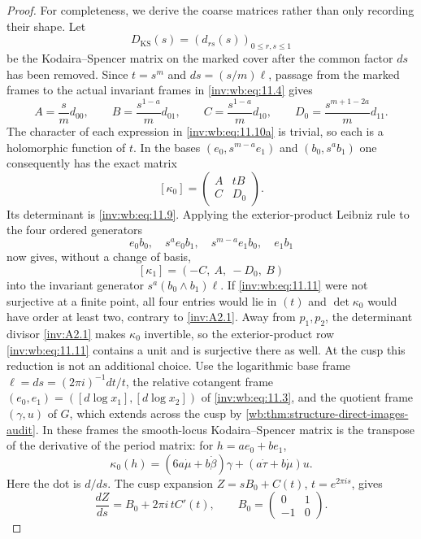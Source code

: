\begin{proof}
For completeness, we derive the coarse matrices rather than only recording
their shape.  Let
\[
 D_{\mathrm{KS}}(s)=(d_{rs}(s))_{0\leq r,s\leq1}
\]
be the Kodaira--Spencer matrix on the marked cover after the common factor
$ds$ has been removed.  Since $t=s^m$ and
$ds=(s/m)\ell$, passage from the marked frames to the actual invariant
frames in \eqref{inv:wb:eq:11.4} gives
\[
 A=\frac{s}{m}d_{00},\qquad
 B=\frac{s^{1-a}}m d_{01},\qquad
 C=\frac{s^{1-a}}m d_{10},\qquad
 D_0=\frac{s^{m+1-2a}}m d_{11}.
\tag{WBH.11.10a}\label{inv:wb:eq:11.10a}
\]
The character of each expression in \eqref{inv:wb:eq:11.10a} is trivial, so each is a
holomorphic function of $t$.  In the bases
$(e_0,s^{m-a}e_1)$ and $(b_0,s^ab_1)$ one consequently has the exact matrix
\[
 [\kappa_0]=\begin{pmatrix}A&tB\\ C&D_0\end{pmatrix}.
\tag{WBH.11.10b}\label{inv:wb:eq:11.10b}
\]
Its determinant is \eqref{inv:wb:eq:11.9}.  Applying the exterior-product Leibniz rule to
the four ordered generators
\[
 e_0b_0,\quad s^ae_0b_1,\quad
 s^{m-a}e_1b_0,\quad e_1b_1
\]
now gives, without a change of basis,
\[
 [\kappa_1]=(-C,\ A,\ -D_0,\ B)
\tag{WBH.11.11}\label{inv:wb:eq:11.11}
\]
into the invariant generator $s^a(b_0\wedge b_1)\ell$.  If \eqref{inv:wb:eq:11.11} were
not surjective at a finite point, all four entries would lie in $(t)$ and
$\det\kappa_0$ would have order at least two, contrary to \cref{inv:A2.1}.  Away
from $p_1,p_2$, the determinant divisor \cref{inv:A2.1} makes $\kappa_0$
invertible, so the exterior-product row \eqref{inv:wb:eq:11.11} contains a unit and is
surjective there as well.  At the cusp this reduction is not an additional
choice.  Use the logarithmic base
frame
\(\ell=ds=(2\pi i)^{-1}dt/t\), the relative cotangent frame
\((e_0,e_1)=([d\log x_1],[d\log x_2])\) of \eqref{inv:wb:eq:11.3}, and the quotient frame
\((\gamma,u)\) of \(G\), which extends across the cusp by
\cref{wb:thm:structure-direct-images-audit}.  In these frames the smooth-locus Kodaira--Spencer matrix is the
transpose of the derivative of the period matrix: for
\(h=a e_0+b e_1\),
\[
 \kappa_0(h)=
 (6a\dot\mu+b\dot\beta)\gamma+
 (a\dot\tau+b\dot\mu)u .
 \tag{WBH.11.11a}\label{inv:wb:eq:11.11a}
\]
Here the dot is \(d/ds\).  The cusp expansion
\(Z=sB_0+C(t)\), \(t=e^{2\pi i s}\), gives
\[
 \frac{dZ}{ds}=B_0+2\pi i\,tC'(t),
 \qquad
 B_0=\begin{pmatrix}0&1\\-1&0\end{pmatrix}.
\]

\end{proof}

